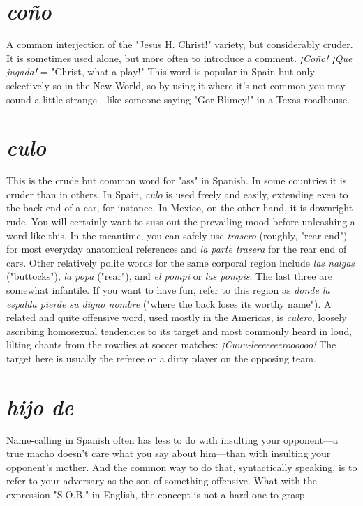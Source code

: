 \section{\emph{coño}}

A common interjection of the "Jesus H. Christ!" variety, but
considerably cruder. It is sometimes used alone, but more often to introduce a comment. \emph{¡Coño! ¡Que jugada!} = "Christ, what a play!"
This word is popular in Spain but only selectively so in the New
World, so by using it where it's not common you may sound a little
strange---like someone saying "Gor Blimey!" in a Texas roadhouse.

\section{\emph{culo}}

This is the crude but common word for "ass" in Spanish. In
some countries it is cruder than in others. In Spain, \emph{culo} is used freely
and easily, extending even to the back end of a car, for instance. In
Mexico, on the other hand, it is downright rude. You will certainly
want to suss out the prevailing mood before unleashing a word like
this. In the meantime, you can safely use \emph{trasero} (roughly, "rear end")
for most everyday anatomical references and \emph{la parte trasera} for the
rear end of cars. Other relatively polite words for the same corporal region include \emph{las nalgas} ("buttocks"), \emph{la popa} ("rear"), and \emph{el pompi} or
\emph{las pompis}. The last three are somewhat infantile. If you want to have
fun, refer to this region as \emph{donde la espalda pierde su digno nombre}
("where the back loses its worthy name").
A related and quite offensive word, used mostly in the Americas, is \emph{culero}, loosely ascribing homosexual tendencies to its target
and most commonly heard in loud, lilting chants from the rowdies at
soccer matches: \emph{¡Cuuu-leeeeeeeroooooo!} The target here is usually the
referee or a dirty player on the opposing team.

\section{\emph{hijo de}}

Name-calling in Spanish often has less to do with insulting
your opponent---a true macho doesn't care what you say about him---than with insulting your opponent's mother. And the common way to
do that, syntactically speaking, is to refer to your adversary as the son
of something offensive. What with the expression "S.O.B." in English,
the concept is not a hard one to grasp.


